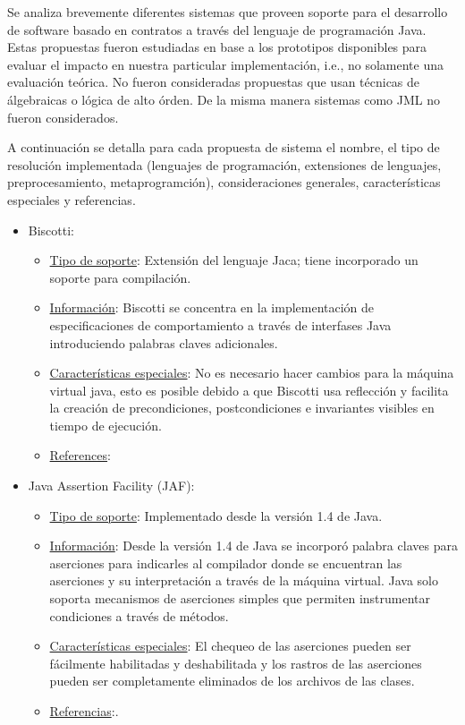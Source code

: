 Se analiza brevemente diferentes sistemas que proveen soporte para el
desarrollo de software basado en contratos a través del lenguaje de
programación Java. Estas propuestas fueron estudiadas en base a los prototipos
disponibles para evaluar el impacto en nuestra particular implementación,
i.e., no solamente una evaluación teórica. No fueron consideradas propuestas
que usan técnicas de álgebraicas o lógica de alto órden. De la misma manera
sistemas como JML \cite{Leavens99} no fueron considerados. 

A continuación se detalla para cada propuesta de sistema el nombre, el tipo de
resolución implementada (lenguajes de programación, extensiones de
lenguajes, preprocesamiento, metaprogramción), consideraciones generales,
características especiales y referencias.

\begin{itemize}
 \item Biscotti:

\begin{itemize}
\item \underline{Tipo de soporte}: Extensión del lenguaje Jaca; tiene
incorporado un
soporte para compilación.
\item \underline{Información}: Biscotti se concentra en la implementación de
especificaciones de comportamiento a través de interfases Java introduciendo
palabras claves adicionales. 

\item \underline{Características especiales}: No es necesario hacer cambios para
la
máquina virtual java, esto es posible debido a que Biscotti usa reflección y
facilita la creación de precondiciones, postcondiciones e invariantes visibles
en tiempo de ejecución.
\item \underline{References}: \cite{Cicalese99}
\end{itemize}

\item Java Assertion Facility (JAF):
\begin{itemize}
\item \underline{Tipo de soporte}: Implementado desde la versión 1.4 de Java.
\item \underline{Información}: Desde la versión 1.4 de Java se incorporó palabra
claves para aserciones para indicarles al compilador donde se encuentran
las aserciones y su interpretación a través de la máquina virtual. Java solo
soporta mecanismos de aserciones simples que permiten instrumentar condiciones
a través de métodos.
\item \underline{Características especiales}: El chequeo de las aserciones
pueden ser
fácilmente habilitadas y deshabilitada y los rastros de las aserciones pueden
ser completamente eliminados de los archivos de las clases. 
\item \underline{Referencias}:\cite{Sun02,Rogers01a,Rogers01b}.
\end{itemize}



\end{itemize}
